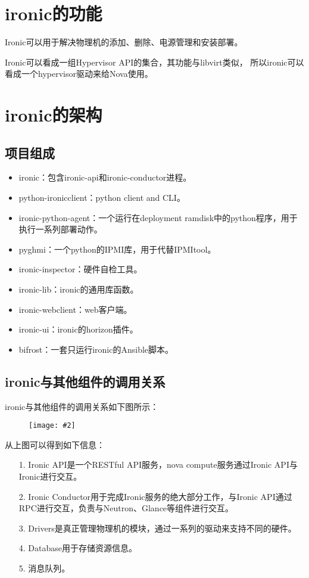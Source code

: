 \documentclass[a4paper,left=1.5cm,right=1.5cm,11pt]{article}
\newcommand{\sizedfic}[2]{\begin{figure}[H]
		\center
		\texttt{[image: \#2]}
	\end{figure}}
\begin{document}
\tableofcontents

\clearpage

\section{ironic的功能}
	Ironic可以用于解决物理机的添加、删除、电源管理和安装部署。\par
	Ironic可以看成一组Hypervisor API的集合，其功能与libvirt类似，
	所以ironic可以看成一个hypervisor驱动来给Nova使用。

\section{ironic的架构}
\subsection{项目组成}
	\begin{itemize}
		\item ironic：包含ironic-api和ironic-conductor进程。
		\item python-ironicclient：python client and CLI。
		\item ironic-python-agent：一个运行在deployment ramdisk中的python程序，用于执行一系列部署动作。
		\item pyghmi：一个python的IPMI库，用于代替IPMItool。
		\item ironic-inspector：硬件自检工具。
		\item ironic-lib：ironic的通用库函数。
		\item ironic-webclient：web客户端。
		\item ironic-ui：ironic的horizon插件。
		\item bifrost：一套只运行ironic的Ansible脚本。
	\end{itemize}

\clearpage

\subsection{ironic与其他组件的调用关系}
	ironic与其他组件的调用关系如下图所示：
	\sizedfic{0.9}{1.png}

	从上图可以得到如下信息：
	\begin{itemize}
		\item[1.] Ironic API是一个RESTful API服务，nova compute服务通过Ironic API与Ironic进行交互。
		\item[2.] Ironic Conductor用于完成Ironic服务的绝大部分工作，与Ironic API通过RPC进行交互，负责与Neutron、Glance等组件进行交互。
		\item[3.] Drivers是真正管理物理机的模块，通过一系列的驱动来支持不同的硬件。
		\item[4.] Database用于存储资源信息。
		\item[5.] 消息队列。
	\end{itemize}
\end{document}
